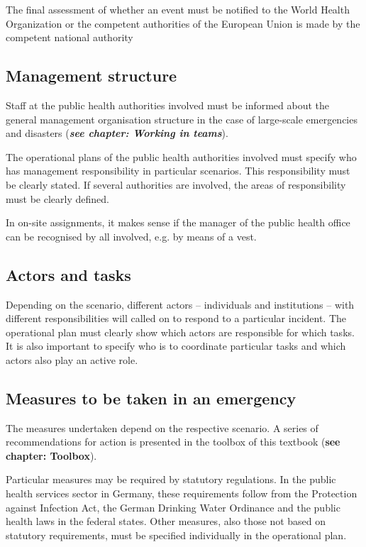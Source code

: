 \documentclass{article}
\begin{document}
The final assessment of whether an event must be notified to the World Health Organization or the competent authorities of the European Union is made by the competent national authority


\subsection{Management structure}\label{H3148819}



Staff at the public health authorities involved must be informed about the general management organisation structure in the case of large-scale emergencies and disasters (\emph{\textbf{see chapter: Working in teams}}).


The operational plans of the public health authorities involved must specify who has management responsibility in particular scenarios. This responsibility must be clearly stated. If several authorities are involved, the areas of responsibility must be clearly defined.


In on-site assignments, it makes sense if the manager of the public health office can be recognised by all involved, e.g. by means of a vest.


\subsection{Actors and tasks}\label{H3781956}



Depending on the scenario, different actors – individuals and institutions – with different responsibilities will called on to respond to a particular incident. The operational plan must clearly show which actors are responsible for which tasks. It is also important to specify who is to coordinate particular tasks and which actors also play an active role.


\subsection{Measures to be taken in an emergency}\label{H7758384}



The measures undertaken depend on the respective scenario. A series of recommendations for action is presented in the toolbox of this textbook (\textbf{see chapter: Toolbox}).


Particular measures may be required by statutory regulations. In the public health services sector in Germany, these requirements follow from the Protection against Infection Act, the German Drinking Water Ordinance and the public health laws in the federal states. Other measures, also those not based on statutory requirements, must be specified individually in the operational plan.
\end{document}
